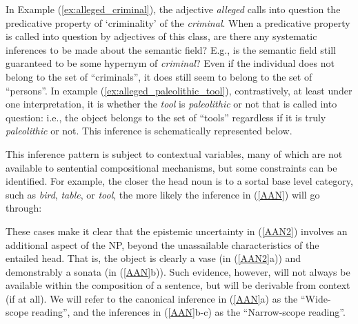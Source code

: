 \documentclass[10pt]{article}
\begin{document}
\noindent 
In Example (\ref{ex:alleged_criminal}), the adjective \emph{alleged} calls into question the predicative property of `criminality' of the \emph{criminal}. When a predicative property is called into question by adjectives of this class, are
there any systematic inferences to be made about the semantic field? E.g., is the semantic field still guaranteed to be some hypernym of
\emph{criminal}? Even if the individual does not belong to the set of
``criminals'', it does still seem to belong to the set of ``persons''. In
example (\ref{ex:alleged_paleolithic_tool}), contrastively, at least under one
interpretation, it is whether the \emph{tool} is \emph{paleolithic} or not that
is called into question: i.e., the object belongs to the set of ``tools''
regardless if it is truly \emph{paleolithic} or not.
This inference is schematically represented below.

\vspace{-0.5em}
\vspace{-0.5em}

\noindent 
This inference pattern is subject to contextual variables, many of which are not available to sentential compositional mechanisms, but some constraints can be identified. For example, the closer the head noun is to a sortal base level category, such as  {\it bird}, {\it table}, or {\it tool}, the more likely the inference in (\ref{AAN}) will go through:

\vspace{-0.5em}


\vspace{-0.5em}

\noindent These cases make it clear that the epistemic uncertainty in (\ref{AAN2}) involves an additional aspect of the NP,  beyond the unassailable characteristics of the entailed head. That is, the object is clearly a vase (in (\ref{AAN2}a)) and demonstrably a sonata (in (\ref{AAN}b)). Such evidence, however, will not always be available within the composition of a sentence, but will be derivable from context (if at all).  We will refer to the canonical inference in (\ref{AAN}a) as the ``Wide-scope reading'', and the inferences in 
(\ref{AAN}b-c) as the ``Narrow-scope reading''. 
\end{document}

